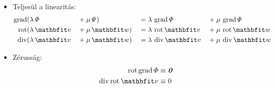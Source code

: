 \documentclass[fleqn]{szb-practice}
\begin{document}
\begin{blueBox}
  \begin{itemize}
    \item Teljesül a linearitás:
          \vspace{-.5em}
          \begin{alignat*}{4}
            \grad & (\lambda \, \varPhi && + \mu \, \varPsi) && = \lambda \, \grad \varPhi && + \mu \, \grad \varPsi
            \\
            \rot  & (\lambda \, \rvec v && + \mu \, \rvec w) && = \lambda \, \rot \rvec v  && + \mu \, \rot \rvec w
            \\
            \Div  & (\lambda \, \rvec v && + \mu \, \rvec w) && = \lambda \, \Div \rvec v  && + \mu \, \Div \rvec w
          \end{alignat*}
          \vspace{-2.5em}

    \item Zérusság:
          \vspace{-.5em}
          \begin{align*}
            \rot \grad \varPhi & \equiv \nvec
            \\
            \Div \rot \rvec v  & \equiv 0
          \end{align*}



\end{itemize}
\end{blueBox}
\end{document}
